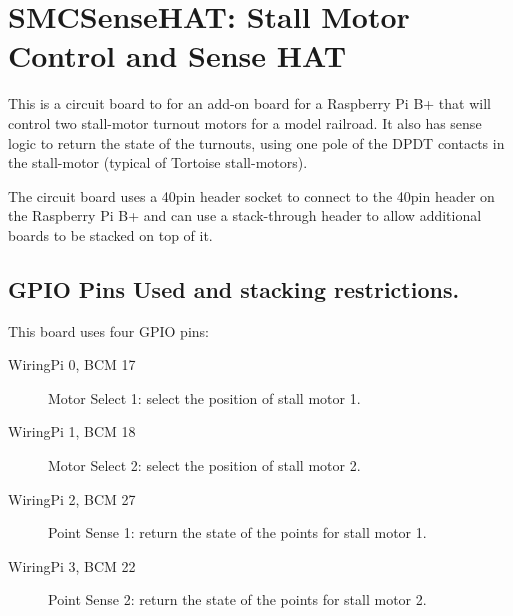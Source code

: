 %
%
%
%
% 
%
%
%
%
%
% 
%

\chapter{SMCSenseHAT: Stall Motor Control and Sense HAT}

This is a circuit board to for an add-on board for a Raspberry Pi B+ that will
control  two  stall-motor  turnout  motors for a model  railroad.  It also has
sense  logic to return the state of the  turnouts,  using one pole of the DPDT
contacts in the stall-motor (typical of Tortoise stall-motors).

The circuit board uses a 40pin header socket to connect to the 40pin header on
the  Raspberry Pi B+ and can use a  stack-through  header to allow  additional
boards to be stacked on top of it.

\section{GPIO Pins Used and stacking restrictions.}

This board uses four GPIO pins:

\begin{description}
\item[WiringPi 0, BCM 17] Motor Select 1: select the position of stall motor 
1. 
\item[WiringPi 1, BCM 18] Motor Select 2: select the position of stall motor 
2. 
\item[WiringPi 2, BCM 27] Point Sense 1: return the state of the points for 
stall motor 1. 
\item[WiringPi 3, BCM 22] Point Sense 2: return the state of the points for 
stall motor 2. 
\end{description}

